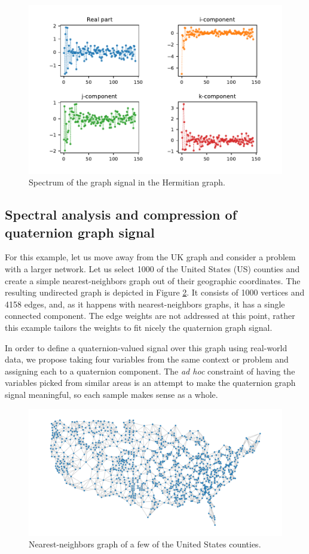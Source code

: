 \begin{figure}
	\centering
	\includegraphics[width=0.7\linewidth]{thesis/Figures/uk_qgft_spectrumsig_hermitian.pdf}
	\caption{Spectrum of the graph signal in the Hermitian graph.}
	\label{fig:uk_qgft_spectrumsig_hermitian}
\end{figure}

\subsection{Spectral analysis and compression of quaternion graph signal}

For this example, let us move away from the UK graph and consider a problem with a larger network. Let us select 1000 of the United States (US) counties and create a simple nearest-neighbors graph out of their geographic coordinates. The resulting undirected graph is depicted in Figure \ref{fig:us_graph}. It consists of 1000 vertices and 4158 edges, and, as it happens with nearest-neighbors graphs, it has a single connected component. The edge weights are not addressed at this point, rather this example tailors the weights to fit nicely the quaternion graph signal.

In order to define a quaternion-valued signal over this graph using real-world data, we propose taking four variables from the same context or problem and assigning each to a quaternion component. The \textit{ad hoc} constraint of having the variables picked from similar areas is an attempt to make the quaternion graph signal meaningful, so each sample makes sense as a whole.

\begin{figure}
\centering
\includegraphics[width=0.8\linewidth]{thesis/Figures/us_graph.pdf}
\caption{Nearest-neighbors graph of a few of the United States counties.}
\label{fig:us_graph}
\end{figure}

